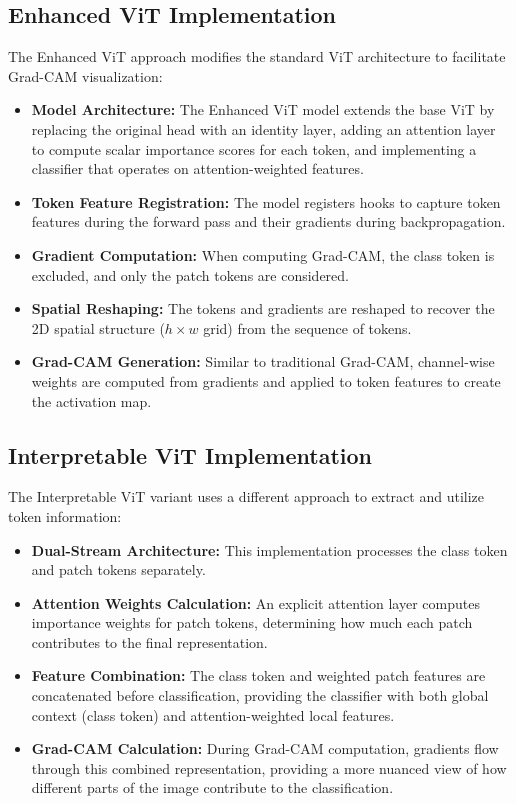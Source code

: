 \documentclass[a4paper,12pt]{report}
\begin{document}
\subsection{Enhanced ViT Implementation}

The Enhanced ViT approach modifies the standard ViT architecture to facilitate Grad-CAM visualization:

\begin{itemize}
\item \textbf{Model Architecture:} The Enhanced ViT model extends the base ViT by replacing the original head with an identity layer, adding an attention layer to compute scalar importance scores for each token, and implementing a classifier that operates on attention-weighted features.
\item \textbf{Token Feature Registration:} The model registers hooks to capture token features during the forward pass and their gradients during backpropagation.
\item \textbf{Gradient Computation:} When computing Grad-CAM, the class token is excluded, and only the patch tokens are considered.
\item \textbf{Spatial Reshaping:} The tokens and gradients are reshaped to recover the 2D spatial structure ($h \times w$ grid) from the sequence of tokens.
\item \textbf{Grad-CAM Generation:} Similar to traditional Grad-CAM, channel-wise weights are computed from gradients and applied to token features to create the activation map.
\end{itemize}

\subsection{Interpretable ViT Implementation}

The Interpretable ViT variant uses a different approach to extract and utilize token information:

\begin{itemize}
\item \textbf{Dual-Stream Architecture:} This implementation processes the class token and patch tokens separately.
\item \textbf{Attention Weights Calculation:} An explicit attention layer computes importance weights for patch tokens, determining how much each patch contributes to the final representation.
\item \textbf{Feature Combination:} The class token and weighted patch features are concatenated before classification, providing the classifier with both global context (class token) and attention-weighted local features.
\item \textbf{Grad-CAM Calculation:} During Grad-CAM computation, gradients flow through this combined representation, providing a more nuanced view of how different parts of the image contribute to the classification.
\end{itemize}
\end{document}
